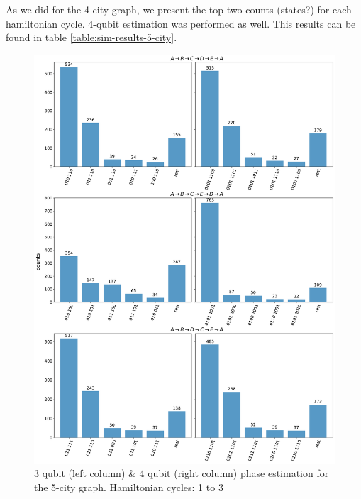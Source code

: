 \documentclass[msc,oneside]{ubcthesis}
\begin{document}
	As we did for the 4-city graph, we present the top two counts (states?) for each hamiltonian cycle. 4-qubit estimation was performed as well. This results can be found in table \ref{table:sim-results-5-city}.
	
		\begin{figure}[!h]
		\centering
		\includegraphics[width=\textwidth,height=0.9\textheight,keepaspectratio]{"graphics/1-3-5city"}
		\caption{3 qubit (left column) \& 4 qubit (right column) phase estimation for the 5-city graph. Hamiltonian cycles: 1 to 3}
		\label{fig:5-city-1-3}
	\end{figure}		
	
\end{document}
